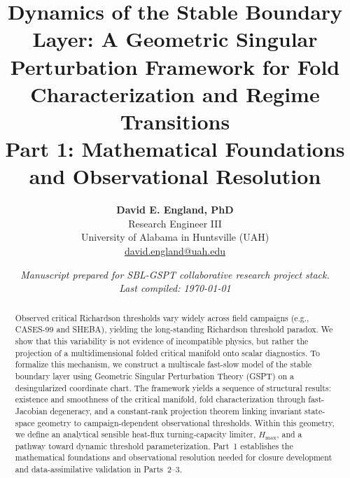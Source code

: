 \documentclass[11pt,letterpaper]{article}
\title{\textbf{Dynamics of the Stable Boundary Layer: A Geometric Singular Perturbation Framework for Fold Characterization and Regime Transitions}\\
\large Part 1: Mathematical Foundations and Observational Resolution}
\author{
    \textbf{David E. England, PhD} \\
    \small Research Engineer III \\
    \small University of Alabama in Huntsville (UAH) \\
    \small \href{mailto:david.england@uah.edu}{david.england@uah.edu}
}
\date{\small\itshape Manuscript prepared for SBL-GSPT collaborative research project stack. \\ Last compiled: \today}
\theoremstyle{plain} %
\theoremstyle{definition} %
\theoremstyle{remark} %
\begin{document}
\maketitle

\begin{abstract}
Observed critical Richardson thresholds vary widely across field campaigns (e.g., CASES-99 and SHEBA), yielding the long-standing Richardson threshold paradox. We show that this variability is not evidence of incompatible physics, but rather the projection of a multidimensional folded critical manifold onto scalar diagnostics. To formalize this mechanism, we construct a multiscale fast-slow model of the stable boundary layer using Geometric Singular Perturbation Theory (GSPT) on a desingularized coordinate chart. The framework yields a sequence of structural results: existence and smoothness of the critical manifold, fold characterization through fast-Jacobian degeneracy, and a constant-rank projection theorem linking invariant state-space geometry to campaign-dependent observational thresholds. Within this geometry, we define an analytical sensible heat-flux turning-capacity limiter, $H_{\max}$, and a pathway toward dynamic threshold parameterization. Part~1 establishes the mathematical foundations and observational resolution needed for closure development and data-assimilative validation in Parts~2--3.
\end{abstract}







\clearpage
\appendix


\clearpage

\nocite{*}



\end{document}
